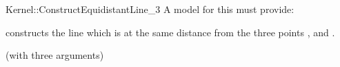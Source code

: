 \begin{ccRefFunctionObjectConcept}{Kernel::ConstructEquidistantLine_3}
A model for this must provide:


{constructs the line which is at the same distance from the three points
,  and .
}

\ccRefines
{} (with three arguments)

\ccSeeAlso
{}

\end{ccRefFunctionObjectConcept}
